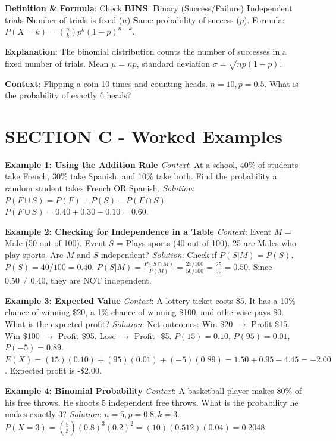 \begin{lessonbox}
\textbf{Definition \& Formula}: 
Check \textbf{BINS}:
\textbf{B}inary (Success/Failure)
\textbf{I}ndependent trials
\textbf{N}umber of trials is fixed ($n$)
\textbf{S}ame probability of success ($p$).
Formula: $P(X=k) = \binom{n}{k} p^k (1-p)^{n-k}$.

\textbf{Explanation}: The binomial distribution counts the number of successes in a fixed number of trials. Mean $\mu = np$, standard deviation $\sigma = \sqrt{np(1-p)}$.

\textbf{Context}: Flipping a coin 10 times and counting heads. $n=10, p=0.5$. What is the probability of exactly 6 heads?
\end{lessonbox}

\section{SECTION C - Worked Examples}

\textbf{Example 1: Using the Addition Rule}
\textit{Context}: At a school, 40\% of students take French, 30\% take Spanish, and 10\% take both. Find the probability a random student takes French OR Spanish.
\textit{Solution}:
$P(F \cup S) = P(F) + P(S) - P(F \cap S)$
$P(F \cup S) = 0.40 + 0.30 - 0.10 = 0.60$.

\textbf{Example 2: Checking for Independence in a Table}
\textit{Context}: 
Event $M$ = Male (50 out of 100). Event $S$ = Plays sports (40 out of 100). 25 are Males who play sports. Are $M$ and $S$ independent?
\textit{Solution}:
Check if $P(S | M) = P(S)$.
$P(S) = 40/100 = 0.40$.
$P(S | M) = \frac{P(S \cap M)}{P(M)} = \frac{25/100}{50/100} = \frac{25}{50} = 0.50$.
Since $0.50 \neq 0.40$, they are NOT independent.

\textbf{Example 3: Expected Value}
\textit{Context}: A lottery ticket costs \$5. It has a 10\% chance of winning \$20, a 1\% chance of winning \$100, and otherwise pays \$0. What is the expected profit?
\textit{Solution}:
Net outcomes: Win \$20 $\rightarrow$ Profit \$15. Win \$100 $\rightarrow$ Profit \$95. Lose $\rightarrow$ Profit -\$5.
$P(15) = 0.10$, $P(95) = 0.01$, $P(-5) = 0.89$.
$E(X) = (15)(0.10) + (95)(0.01) + (-5)(0.89) = 1.50 + 0.95 - 4.45 = -2.00$.
Expected profit is -\$2.00.

\textbf{Example 4: Binomial Probability}
\textit{Context}: A basketball player makes 80\% of his free throws. He shoots 5 independent free throws. What is the probability he makes exactly 3?
\textit{Solution}:
$n=5, p=0.8, k=3$.
$P(X=3) = \binom{5}{3} (0.8)^3 (0.2)^2 = (10)(0.512)(0.04) = 0.2048$.

